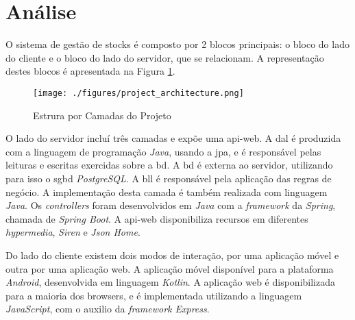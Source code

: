 %
%
\section{Análise}\label{sec32}

O sistema de gestão de stocks é composto por 2 blocos principais: o bloco do lado do cliente e o bloco do lado do servidor, que se relacionam. A representação destes blocos é apresentada na Figura \ref{project-layers-structure}. 

\begin{figure}[H]
	\centering
	\texttt{[image: ./figures/project\_architecture.png]}
	\caption{Estrura por Camadas do Projeto}
	\label{project-layers-structure}
\end{figure}

O lado do servidor incluí três camadas e expõe uma \gls{api-web}. A \acrfull{dal} é produzida com a linguagem de programação \textit{Java}, usando a \acrfull{jpa}, e é responsável pelas leituras e escritas exercidas sobre a \acrfull{bd}. A \acrshort{bd} é externa ao servidor, utilizando para isso o \acrfull{sgbd} \textit{PostgreSQL}. A \acrfull{bll} é responsável pela aplicação das regras de negócio. A implementação desta camada é também realizada com linguagem \textit{Java}. Os \textit{controllers} foram desenvolvidos em \textit{Java} com a \textit{framework} da \textit{Spring}, chamada de \textit{Spring Boot}. A \gls{api-web} disponibiliza recursos em diferentes \textit{hypermedia}, \textit{Siren} e \textit{Json Home}.

Do lado do cliente existem dois modos de interação, por uma aplicação móvel e outra por uma aplicação web. A aplicação móvel disponível para a plataforma \textit{Android}, desenvolvida em linguagem \textit{Kotlin}. A aplicação web é disponibilizada para a maioria dos browsers, e é implementada utilizando a linguagem \textit{JavaScript}, com o auxilio da \textit{framework Express}.